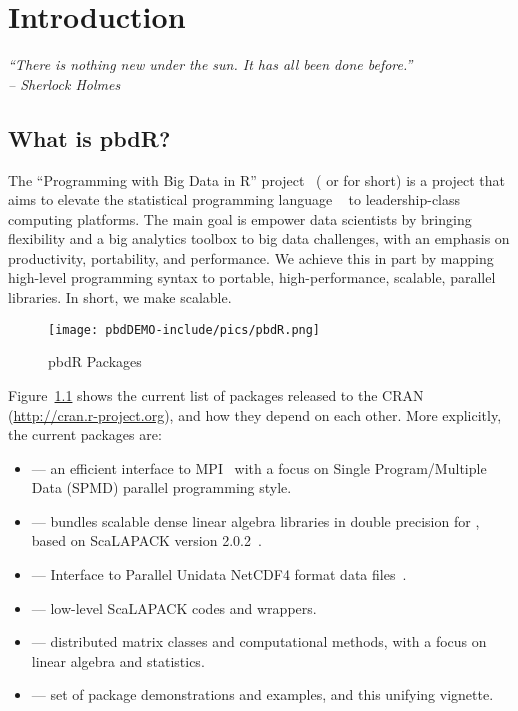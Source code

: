 \chapter[Introduction]{Introduction}
\label{sec:introduction}


{\it
``There is nothing new under the sun. It has all been done before.'' \\
\--- Sherlock Holmes
}


\section{What is pbdR?}

The ``Programming with Big Data in R'' project~\citep{pbdR2012}
( or 
for short) is a project that aims to elevate the statistical programming
language ~\citep{Rcore} to leadership-class computing platforms.
The main goal is empower data scientists by bringing flexibility and a big
analytics toolbox to big data challenges, with an emphasis on productivity,
portability, and performance.  We achieve this in part by mapping high-level
programming syntax to portable, high-performance, scalable, parallel libraries.
In short, we make  scalable.

\begin{figure}[h]
 \centering
 \texttt{[image: pbdDEMO-include/pics/pbdR.png]}
 \caption{pbdR Packages}
 \label{fig:pbdrpackages}
\end{figure}

Figure~\ref{fig:pbdrpackages} shows the current list of 
packages released
to the CRAN (\url{http://cran.r-project.org}), and how they depend on each
other. More explicitly, the current  packages
\citep{Chen2012pbdMPIpackage,Chen2012pbdSLAPpackage,Schmidt2012pbdBASEpackage,
Schmidt2012pbdDMATpackage,Patel2013pbdNCDF4package,Schmidt2013pbdDEMOpackage}
are:

\begin{itemize}
 \item {} --- an efficient interface to MPI~\citep{MPI1994} with a
       focus on Single Program/Multiple Data (SPMD)
       parallel programming style.
 \item {} --- bundles scalable dense linear algebra libraries in
       double precision for , based on ScaLAPACK
       version 2.0.2~\citep{slug}.~
 \item {} --- Interface to Parallel Unidata
       NetCDF4 format data files~\citep{netcdf}.
 \item {} --- low-level ScaLAPACK codes and wrappers.
 \item {} --- distributed matrix classes and computational methods,
       with a focus on linear algebra and statistics.
 \item {} --- set of package demonstrations and examples, and this
       unifying vignette.
\end{itemize}

